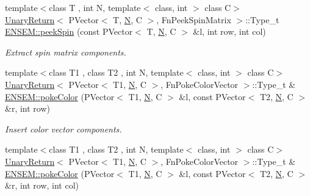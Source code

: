 \begin{DoxyCompactItemize}
{\footnotesize template$<$class T , int N, template$<$ class, int $>$ class C$>$ }\\\mbox{\hyperlink{structUnaryReturn}{Unary\+Return}}$<$ P\+Vector$<$ T, \mbox{\hyperlink{adat__devel_2lib_2hadron_2operator__name__util_8cc_a7722c8ecbb62d99aee7ce68b1752f337}{N}}, C $>$, Fn\+Peek\+Spin\+Matrix $>$\+::Type\+\_\+t \mbox{\hyperlink{group__primvector_ga5461f8956839af7e7079b717601376a7}{E\+N\+S\+E\+M\+::peek\+Spin}} (const P\+Vector$<$ T, \mbox{\hyperlink{adat__devel_2lib_2hadron_2operator__name__util_8cc_a7722c8ecbb62d99aee7ce68b1752f337}{N}}, C $>$ \&l, int row, int col)
\begin{DoxyCompactList}\small\item\em Extract spin matrix components. \end{DoxyCompactList}\item 
{\footnotesize template$<$class T1 , class T2 , int N, template$<$ class, int $>$ class C$>$ }\\\mbox{\hyperlink{structUnaryReturn}{Unary\+Return}}$<$ P\+Vector$<$ T1, \mbox{\hyperlink{adat__devel_2lib_2hadron_2operator__name__util_8cc_a7722c8ecbb62d99aee7ce68b1752f337}{N}}, C $>$, Fn\+Poke\+Color\+Vector $>$\+::Type\+\_\+t \& \mbox{\hyperlink{group__primvector_ga8643fc63839f4ef1bdbb168de2385c5e}{E\+N\+S\+E\+M\+::poke\+Color}} (P\+Vector$<$ T1, \mbox{\hyperlink{adat__devel_2lib_2hadron_2operator__name__util_8cc_a7722c8ecbb62d99aee7ce68b1752f337}{N}}, C $>$ \&l, const P\+Vector$<$ T2, \mbox{\hyperlink{adat__devel_2lib_2hadron_2operator__name__util_8cc_a7722c8ecbb62d99aee7ce68b1752f337}{N}}, C $>$ \&r, int row)
\begin{DoxyCompactList}\small\item\em Insert color vector components. \end{DoxyCompactList}\item 
{\footnotesize template$<$class T1 , class T2 , int N, template$<$ class, int $>$ class C$>$ }\\\mbox{\hyperlink{structUnaryReturn}{Unary\+Return}}$<$ P\+Vector$<$ T1, \mbox{\hyperlink{adat__devel_2lib_2hadron_2operator__name__util_8cc_a7722c8ecbb62d99aee7ce68b1752f337}{N}}, C $>$, Fn\+Poke\+Color\+Vector $>$\+::Type\+\_\+t \& \mbox{\hyperlink{group__primvector_ga756245fd2f8bde2eab2ef42e08578af6}{E\+N\+S\+E\+M\+::poke\+Color}} (P\+Vector$<$ T1, \mbox{\hyperlink{adat__devel_2lib_2hadron_2operator__name__util_8cc_a7722c8ecbb62d99aee7ce68b1752f337}{N}}, C $>$ \&l, const P\+Vector$<$ T2, \mbox{\hyperlink{adat__devel_2lib_2hadron_2operator__name__util_8cc_a7722c8ecbb62d99aee7ce68b1752f337}{N}}, C $>$ \&r, int row, int col)

\end{DoxyCompactItemize}
